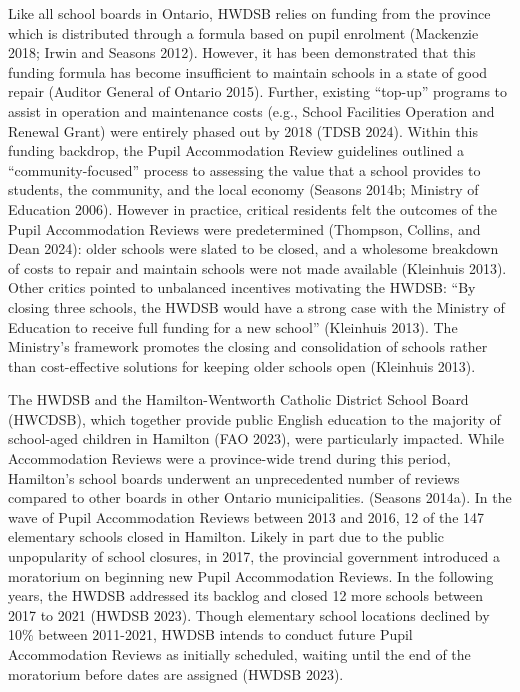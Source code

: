 \documentclass[
default
]{sn-jnl}
\begin{document}
Like all school boards in Ontario, HWDSB relies on funding from the
province which is distributed through a formula based on pupil enrolment
(Mackenzie 2018; Irwin and Seasons 2012). However, it has been
demonstrated that this funding formula has become insufficient to
maintain schools in a state of good repair (Auditor General of Ontario
2015). Further, existing ``top-up'' programs to assist in operation and
maintenance costs (e.g., School Facilities Operation and Renewal Grant)
were entirely phased out by 2018 (TDSB 2024). Within this funding
backdrop, the Pupil Accommodation Review guidelines outlined a
``community-focused'' process to assessing the value that a school
provides to students, the community, and the local economy (Seasons
2014b; Ministry of Education 2006). However in practice, critical
residents felt the outcomes of the Pupil Accommodation Reviews were
predetermined (Thompson, Collins, and Dean 2024): older schools were
slated to be closed, and a wholesome breakdown of costs to repair and
maintain schools were not made available (Kleinhuis 2013). Other critics
pointed to unbalanced incentives motivating the HWDSB: ``By closing
three schools, the HWDSB would have a strong case with the Ministry of
Education to receive full funding for a new school'' (Kleinhuis 2013).
The Ministry's framework promotes the closing and consolidation of
schools rather than cost-effective solutions for keeping older schools
open (Kleinhuis 2013).

The HWDSB and the Hamilton-Wentworth Catholic District School Board
(HWCDSB), which together provide public English education to the
majority of school-aged children in Hamilton (FAO 2023), were
particularly impacted. While Accommodation Reviews were a province-wide
trend during this period, Hamilton's school boards underwent an
unprecedented number of reviews compared to other boards in other
Ontario municipalities. (Seasons 2014a). In the wave of Pupil
Accommodation Reviews between 2013 and 2016, 12 of the 147 elementary
schools closed in Hamilton. Likely in part due to the public
unpopularity of school closures, in 2017, the provincial government
introduced a moratorium on beginning new Pupil Accommodation Reviews. In
the following years, the HWDSB addressed its backlog and closed 12 more
schools between 2017 to 2021 (HWDSB 2023). Though elementary school
locations declined by 10\% between 2011-2021, HWDSB intends to conduct
future Pupil Accommodation Reviews as initially scheduled, waiting until
the end of the moratorium before dates are assigned (HWDSB 2023).
\end{document}
